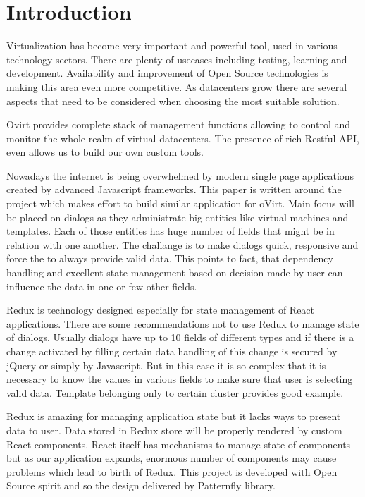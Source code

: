 
\chapter{Introduction}
Virtualization has become very important and powerful tool, used in various technology sectors. There are plenty of usecases including testing, learning and development. Availability and improvement of Open Source technologies is making this area even more competitive. As datacenters grow there are several aspects that need to be considered when choosing the most suitable solution.

Ovirt provides complete stack of management functions allowing to control and monitor the whole realm of virtual datacenters. The presence of rich Restful API, even allows us to build our own custom tools. 

Nowadays the internet is being overwhelmed by modern single page applications created by advanced Javascript frameworks. This paper is written around the project which makes effort to build similar application for oVirt. Main focus will be placed on dialogs as they administrate big entities like virtual machines and templates. Each of those entities has huge number of fields that might be in relation with one another. The challange is to make dialogs quick, responsive and force the to always provide valid data. This points to fact, that dependency handling and excellent state management based on decision made by user can influence the data in one or few other fields.

Redux is technology designed especially for state management of React applications. There are some recommendations not to use Redux to manage state of dialogs. Usually dialogs have up to 10 fields of different types and if there is a change activated by filling certain data handling of this change is secured by jQuery or simply by Javascript. But in this case it is so complex that it is necessary to know the values in various fields to make sure that user is selecting valid data. Template belonging only to certain cluster provides good example.

Redux is amazing for managing application state but it lacks ways to present data to user. Data stored in Redux store will be properly rendered by custom React components. React itself has mechanisms to manage state of components but as our application expands, enormous number of components may cause problems which lead to birth of Redux. This project is developed with Open Source spirit and so the design delivered by Patternfly library.


